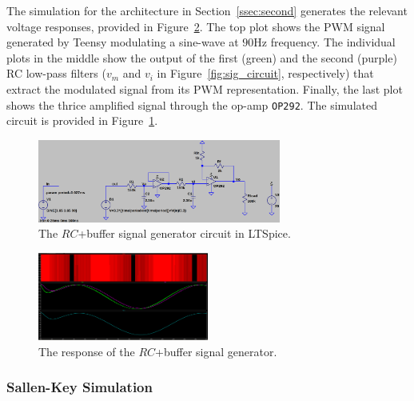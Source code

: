 The simulation for the architecture in Section~\ref{ssec:second} generates the
relevant voltage responses, provided in Figure~\ref{fig:response}. The top plot
shows the PWM signal generated by Teensy modulating a sine-wave at
$90$\unit{\hertz} frequency. The individual plots in the middle show the output
of the first (green) and the second (purple) RC low-pass filters ($v_m$ and
$v_i$ in Figure~\ref{fig:sig_circuit}, respectively) that extract the modulated
signal from its PWM representation. Finally, the last plot shows the thrice
amplified signal through the op-amp \texttt{OP292}. The simulated circuit is
provided in Figure~\ref{fig:rcbuffer}.
%
\begin{figure}[htb] 
\includegraphics[width=8cm]{./figures/rcbuffer.png}
\caption{The $RC$+buffer signal generator circuit in LTSpice.} 
\label{fig:rcbuffer}
\end{figure}
%
\begin{figure}[h]
\includegraphics[width=0.5\textwidth]{./figures/pwm_filtered_one_two_final_signal.png}
\caption{The response of the $RC$+buffer signal generator.} 
\label{fig:response}
\end{figure}


\vspace{-1em}
\subsubsection{Sallen-Key Simulation} 
\vspace{-1em}



